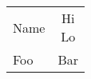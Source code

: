 \begin{tabular}{lc}
	Name & \shortstack{Hi \\ Lo} \\
	Foo  & Bar                   \\
\end{tabular}

